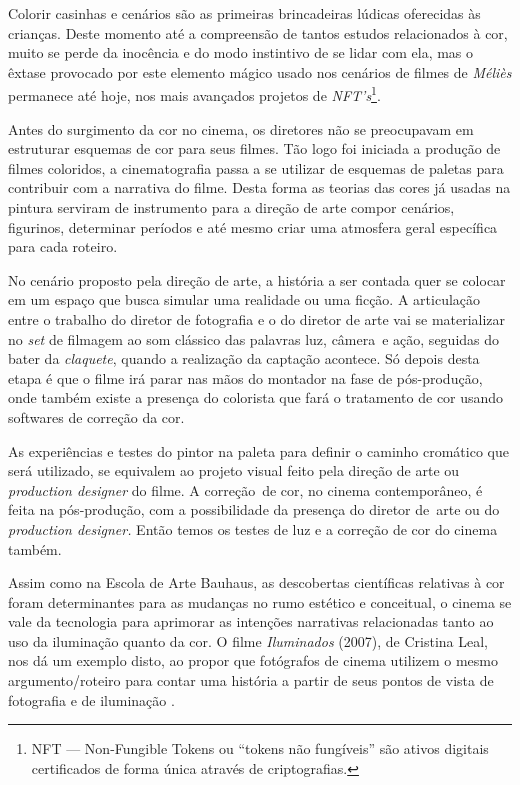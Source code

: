 Colorir casinhas e cenários são as primeiras brincadeiras lúdicas
oferecidas às crianças. Deste momento até a compreensão de tantos
estudos relacionados à cor, muito se perde da inocência e do modo
instintivo de se lidar com ela, mas o êxtase provocado por este
elemento mágico usado nos cenários de filmes de \emph{Méliès} permanece
até hoje, nos mais avançados projetos de \emph{NFT's}\footnote{NFT ---
	Non-Fungible Tokens ou \enquote{tokens não fungíveis} são ativos
	digitais certificados de forma única através de criptografias.}.

Antes do surgimento da cor no cinema, os diretores não se preocupavam
em estruturar esquemas de cor para seus filmes. Tão logo foi iniciada a
produção de filmes coloridos, a cinematografia passa a se utilizar de
esquemas de paletas para contribuir com a narrativa do filme. Desta
forma as teorias das cores já usadas na pintura serviram de instrumento
para a direção de arte compor cenários, figurinos, determinar períodos
e até mesmo criar uma atmosfera geral específica para cada roteiro.

No cenário proposto pela direção de arte, a história a ser contada quer
se colocar em um espaço que busca simular uma realidade ou uma ficção.
A articulação entre o trabalho do diretor de fotografia e o do diretor
de arte vai se materializar no \emph{set} de filmagem ao som clássico
das palavras luz, câmera~e ação, seguidas do bater da \emph{claquete},
quando a realização da captação acontece. Só depois desta etapa é que o
filme irá parar nas mãos do montador na fase de pós-produção, onde
também existe a presença do colorista que fará o tratamento de cor
usando softwares de correção da cor.

As experiências e testes do pintor na paleta para definir o caminho
cromático que será utilizado, se equivalem ao projeto visual feito pela
direção de arte ou \emph{production designer} do filme. A correção~de
cor, no cinema contemporâneo, é feita na pós-produção, com a
possibilidade da presença do diretor de~arte ou do \emph{production
	designer.} Então temos os testes de luz e a correção de cor do cinema
também.

Assim como na Escola de Arte Bauhaus, as descobertas científicas
relativas à cor foram determinantes para as mudanças no rumo estético e
conceitual, o cinema se vale da tecnologia para aprimorar as intenções
narrativas relacionadas tanto ao uso da iluminação quanto da cor. O
filme \emph{Iluminados} (2007), de Cristina Leal, nos dá um exemplo
disto, ao propor que fotógrafos de cinema utilizem o mesmo
argumento/roteiro para contar uma história a partir de seus pontos de
vista de fotografia e de iluminação \parencite{leal2008iluminados}.

